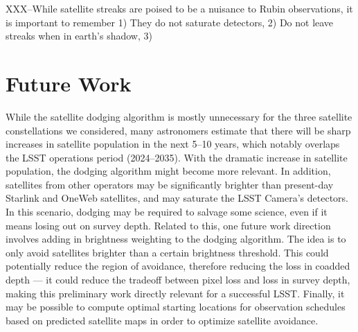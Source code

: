 \documentclass[linenumbers]{aastex631}
\begin{document}
XXX--While satellite streaks are poised to be a nuisance to Rubin observations, it is important to remember 1) They do not saturate detectors, 2) Do not leave streaks when in earth's shadow, 3) 

\section{Future Work}
While the satellite dodging algorithm is mostly unnecessary for the three satellite constellations we considered, many astronomers estimate that there will be sharp increases in satellite population in the next 5–10 years, which notably overlaps the LSST operations period (2024–2035). With the dramatic increase in satellite population, the dodging algorithm might become more relevant. In addition, satellites from other operators may be significantly brighter than present-day Starlink and OneWeb satellites, and may saturate the LSST Camera’s detectors. In this scenario, dodging may be required to salvage some science, even if it means losing out on survey depth. Related to this, one future work direction involves adding in brightness weighting to the dodging algorithm. The idea is to only avoid satellites brighter than a certain brightness threshold. This could potentially reduce the region of avoidance, therefore reducing the loss in coadded depth — it could reduce the tradeoff between pixel loss and loss in survey depth, making this preliminary work directly relevant for a successful LSST. Finally, it may be possible to compute optimal starting locations for observation schedules based on predicted satellite maps in order to optimize satellite avoidance.






{}

\end{document}
